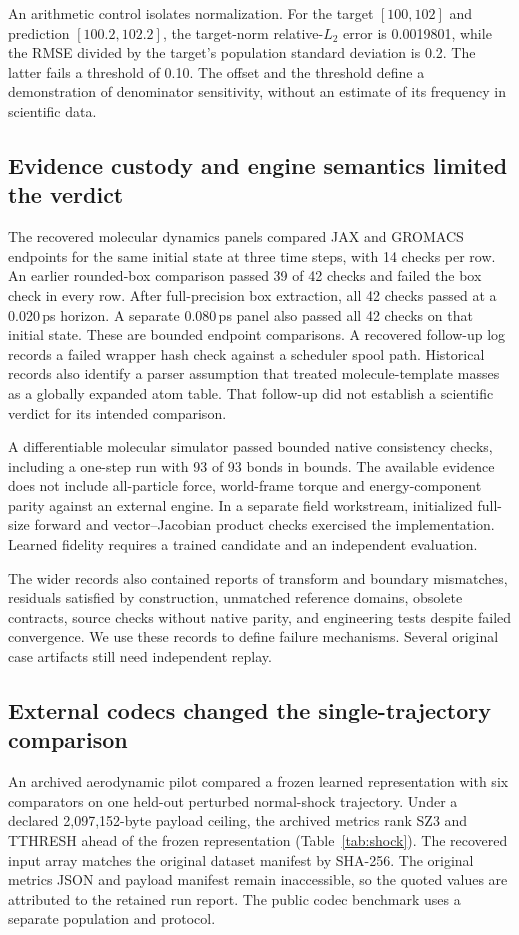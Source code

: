 \documentclass[10pt,a4paper,twocolumn]{article}
\begin{document}
An arithmetic control isolates normalization. For the target $[100,102]$ and prediction $[100.2,102.2]$, the target-norm relative-$L_2$ error is 0.0019801, while the RMSE divided by the target's population standard deviation is 0.2. The latter fails a threshold of 0.10. The offset and the threshold define a demonstration of denominator sensitivity, without an estimate of its frequency in scientific data.

\subsection{Evidence custody and engine semantics limited the verdict}
The recovered molecular dynamics panels compared JAX and GROMACS endpoints for the same initial state at three time steps, with 14 checks per row. An earlier rounded-box comparison passed 39 of 42 checks and failed the box check in every row. After full-precision box extraction, all 42 checks passed at a 0.020\,ps horizon. A separate 0.080\,ps panel also passed all 42 checks on that initial state. These are bounded endpoint comparisons. A recovered follow-up log records a failed wrapper hash check against a scheduler spool path. Historical records also identify a parser assumption that treated molecule-template masses as a globally expanded atom table. That follow-up did not establish a scientific verdict for its intended comparison.

A differentiable molecular simulator passed bounded native consistency checks, including a one-step run with 93 of 93 bonds in bounds. The available evidence does not include all-particle force, world-frame torque and energy-component parity against an external engine. In a separate field workstream, initialized full-size forward and vector--Jacobian product checks exercised the implementation. Learned fidelity requires a trained candidate and an independent evaluation.

The wider records also contained reports of transform and boundary mismatches, residuals satisfied by construction, unmatched reference domains, obsolete contracts, source checks without native parity, and engineering tests despite failed convergence. We use these records to define failure mechanisms. Several original case artifacts still need independent replay.

\subsection{External codecs changed the single-trajectory comparison}
An archived aerodynamic pilot compared a frozen learned representation with six comparators on one held-out perturbed normal-shock trajectory. Under a declared 2,097,152-byte payload ceiling, the archived metrics rank SZ3 and TTHRESH ahead of the frozen representation (Table~\ref{tab:shock}). The recovered input array matches the original dataset manifest by SHA-256. The original metrics JSON and payload manifest remain inaccessible, so the quoted values are attributed to the retained run report. The public codec benchmark uses a separate population and protocol.
\end{document}

